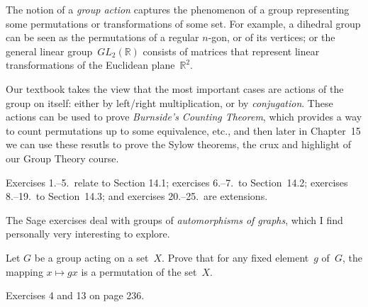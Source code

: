 \documentclass[oneside,10pt]{amsart}
\begin{document}


The notion of a \emph{group action} captures the phenomenon of a group representing some
permutations or transformations of some set.
For example, a dihedral group can be seen as the permutations of a regular $n$-gon, or of its vertices;
or the general linear group~$GL_2(\mathbb{R})$ consists of matrices that represent linear transformations
of the Euclidean plane~$\mathbb{R}^2$.

Our textbook takes the view that the most important cases are
actions of the group on itself:
either by left/right multiplication, or by \emph{conjugation}.
These actions can be used to prove \emph{Burnside's Counting Theorem},
which provides a way to count permutations up to some equivalence, etc.,
and then later in Chapter~15 we can use these resutls to prove the Sylow theorems,
the crux and highlight of our Group Theory course.



Exercises 1.--5.\ relate to Section 14.1;
exercises 6.--7.\ to Section~14.2;
exercises 8.--19.\ to Section~14.3;
and exercises 20.--25.\ are extensions.

The Sage exercises deal with groups of \emph{automorphisms of graphs},
which I find personally very interesting to explore.


Let $G$ be a group acting on a set~$X$.
Prove that for any fixed element~$g$ of~$G$,
the mapping $x \mapsto gx$ is a permutation of the set~$X$.

Exercises 4 and 13 on page 236.
\end{document}
